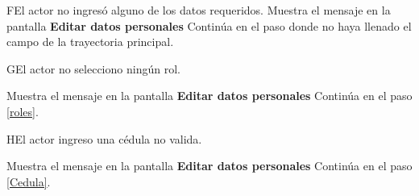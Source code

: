 \begin{UCtrayectoriaA}{F}{El actor no ingresó alguno de los datos requeridos.}
	\UCpaso[\UCsist] Muestra el mensaje  en la pantalla \textbf{Editar datos personales}
	\UCpaso[] Continúa en el paso donde no haya llenado el campo de la trayectoria principal.
\end{UCtrayectoriaA}

\begin{UCtrayectoriaA}{G}{El actor no selecciono ningún rol.}
	
	\UCpaso[\UCsist] Muestra el mensaje en la pantalla \textbf{Editar datos personales}
	\UCpaso[] Continúa en el paso \ref{roles}.
	
\end{UCtrayectoriaA}


\begin{UCtrayectoriaA}{H}{El actor ingreso una cédula no valida.}
	
	\UCpaso[\UCsist] Muestra el mensaje en la pantalla \textbf{Editar datos personales}
	\UCpaso[] Continúa en el paso \ref{Cedula}.
	
\end{UCtrayectoriaA}
 



 

